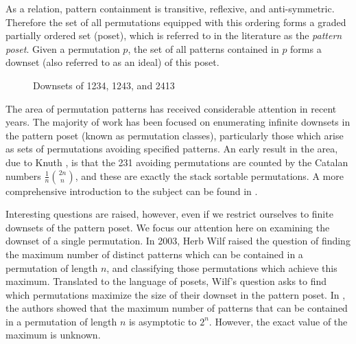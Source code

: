 \documentclass[11pt]{article}
\theoremstyle{plain}
\theoremstyle{definition}
\begin{document}
  As a relation, pattern containment is transitive, reflexive, and
  anti-symmetric. Therefore the set of all permutations equipped with this ordering
  forms a graded partially ordered set (poset), which is referred to
  in the literature as the \emph{pattern poset}. Given a permutation $p$, the
  set of all patterns contained in $p$ forms a downset (also referred to as an
  ideal) of this poset.


  \begin{figure}[ht]
  \centering
  \caption{Downsets of 1234, 1243, and 2413}
  \end{figure}

  
  The area of permutation patterns has received considerable attention in recent
  years. The majority of work has been focused on enumerating infinite downsets in
  the pattern poset (known as permutation classes), particularly those which
  arise as sets of permutations avoiding specified patterns. 
  An early result in the area, due to Knuth \cite{knuth3}, is that the 231 avoiding
  permutations are counted by the Catalan numbers $\frac{1}{n}\binom{2n}{n}$,
  and these are exactly the stack sortable permutations.  A more comprehensive
  introduction to the subject can be found in \cite{bonabook}. 
  
  Interesting questions are raised, however, even if we restrict ourselves to
  finite downsets of the pattern poset.  We focus our attention here on
  examining the downset of a single permutation.  
  In 2003, Herb Wilf raised the question of finding the maximum number of distinct
  patterns which can be contained in a permutation of length $n$, and
  classifying those permutations which achieve this maximum.
  Translated to the language of posets, Wilf's question asks to find which
  permutations maximize the size of their downset in the pattern poset. 
  In \cite{albert}, the authors showed that the maximum number of patterns that
  can be contained in a permutation of length $n$ is asymptotic to $2^n$.
  However, the exact value of the maximum is unknown. 
\end{document}
